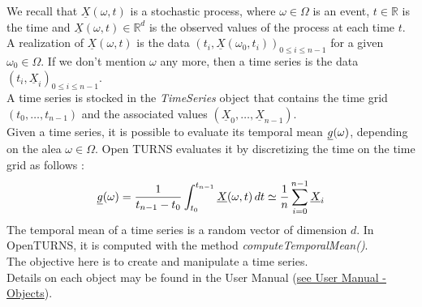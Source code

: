 \renewcommand{\filename}{docUC_TimeSeries.tex}
\renewcommand{\filetitle}{UC : Manipulation of a time series}

 \HeaderIILevel

\label{UCtimeSeries}



We recall that $\underline{X}(\omega,t)$ is a stochastic process, where $\omega \in \Omega$ is an event, $t \in \mathbb{R}$ is the time and $\underline{X}(\omega,t) \in \mathbb{R}^d$ is the observed values of the process at each time $t$.\\

A realization of $\underline{X}(\omega,t)$ is the data $(t_i, \underline{X}(\omega_0,t_i))_{0 \leq i \leq n-1}$ for a given $\omega_0 \in \Omega$. If we don't mention $\omega$ any more, then a time series is the data  $(t_i, \underline{X}_i)_{0 \leq i \leq n-1}$. \\
A time series is stocked in the \emph{TimeSeries} object that contains the time grid $(t_0, \hdots, t_{n-1})$ and the associated values $(\underline{X}_0, \hdots, \underline{X}_{n-1})$.\\

Given a time series, it is possible to evaluate  its temporal mean ${\underline{g}}(\omega)$, depending on the alea $\omega \in \Omega$. Open TURNS evaluates it by discretizing the time on the time grid as follows :
$$
\displaystyle {\underline{g}}(\omega) =  \frac{1}{t_{n-1} - t_0} \int_{t_0}^{t_{n-1}} \underline{X}(\omega,t) \, dt \simeq  \frac{1}{n} \sum_{i=0}^{n-1} \underline{X}_i
$$
The temporal mean of a time series is a random vector of dimension $d$. In OpenTURNS, it is computed with the method \emph{computeTemporalMean()}.\\

The objective here is to create and manipulate a time series.\\

Details on each object may be found in the User Manual  (\href{OpenTURNS_UserManual_TUI.pdf}{see User Manual - Objects}).\\

